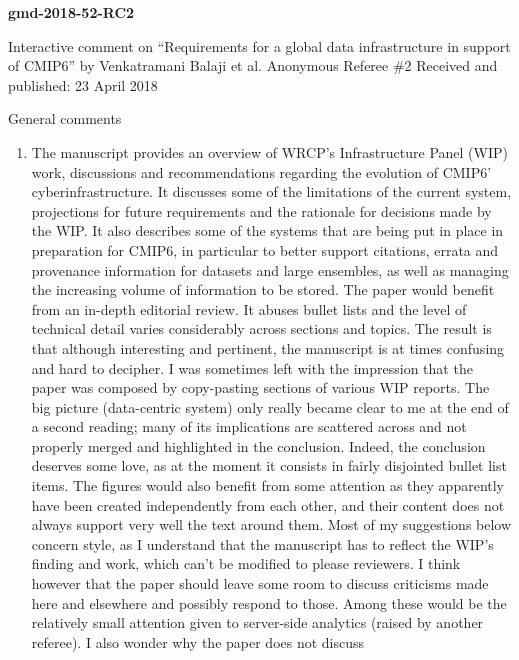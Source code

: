 \documentclass[gmd,manuscript]{copernicus}
\begin{document}
\pagebreak


\textbf{gmd-2018-52-RC2}

Interactive comment on “Requirements for a
global data infrastructure in support of CMIP6” by
Venkatramani Balaji et al.
Anonymous Referee \#2
Received and published: 23 April 2018

General comments

\begin{enumerate}[label=RC2-\arabic*,leftmargin=*]
\item The manuscript provides an overview of WRCP’s Infrastructure
  Panel (WIP) work, discussions and recommendations regarding the
  evolution of CMIP6’ cyberinfrastructure. It discusses some of the
  limitations of the current system, projections for future
  requirements and the rationale for decisions made by the WIP. It
  also describes some of the systems that are being put in place in
  preparation for CMIP6, in particular to better support citations,
  errata and provenance information for datasets and large ensembles,
  as well as managing the increasing volume of information to be
  stored. The paper would benefit from an in-depth editorial review.
  It abuses bullet lists and the level of technical detail varies
  considerably across sections and topics. The result is that although
  interesting and pertinent, the manuscript is at times confusing and
  hard to decipher. I was sometimes left with the impression that the
  paper was composed by copy-pasting sections of various WIP reports.
  The big picture (data-centric system) only really became clear to me
  at the end of a second reading; many of its implications are
  scattered across and not properly merged and highlighted in the
  conclusion. Indeed, the conclusion deserves some love, as at the
  moment it consists in fairly disjointed bullet list items. The
  figures would also benefit from some attention as they apparently
  have been created independently from each other, and their content
  does not always support very well the text around them. Most of my
  suggestions below concern style, as I understand that the manuscript
  has to reflect the WIP’s finding and work, which can’t be modified
  to please reviewers. I think however that the paper should leave
  some room to discuss criticisms made here and elsewhere and possibly
  respond to those. Among these would be the relatively small
  attention given to server-side analytics (raised by another
  referee). I also wonder why the paper does not discuss

\end{enumerate}
\end{document}
